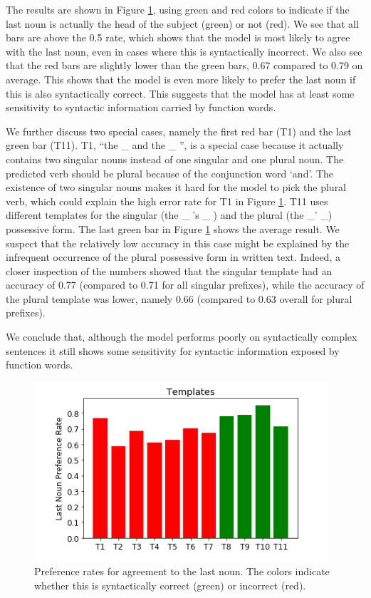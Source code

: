 The results are shown in Figure \ref{fig:last_noun_rates},
using green and red colors to indicate if 
the last noun is actually the head of the subject (green)
or not (red). 
%
We see that all bars are above the 0.5 rate,
which shows that the model is most
likely to agree with the last noun,
even in cases where this is syntactically incorrect. 
%
We also see that the red bars are slightly
lower than the green bars,
0.67 compared to 0.79 on average.
This shows that the model is even more likely
to prefer the last noun if this is
also syntactically correct.
This suggests that the model has 
at least some sensitivity
to syntactic information carried by function words.
%

%
We further discuss two special cases,
namely the first red bar (T1) and 
the last green bar (T11).
T1, ``the \_ and the \_ '', is a special case because it 
actually contains two singular nouns
instead of one singular and one plural noun. 
The predicted verb should be plural because of the
conjunction word `and'.
The existence of two singular nouns 
makes it hard for the model
to pick the plural verb,
which could explain the high error rate
for T1 in Figure \ref{fig:last_noun_rates}.
%
T11 uses different templates for the singular 
(the \_ 's \_ ) and the plural (the \_' \_) possessive form.
The last green bar in Figure \ref{fig:last_noun_rates} shows the average result.
We suspect that the relatively low accuracy
in this case might be explained by the infrequent
occurrence of the plural possessive form in written text.
Indeed, a closer inspection of the numbers showed that
the singular template had an accuracy
of 0.77 (compared to 0.71 for all singular prefixes), 
while the accuracy of the plural template
was lower, namely 0.66 (compared to 0.63 overall for plural prefixes).
%

We conclude that, although the model 
performs poorly on syntactically complex sentences it
still shows some sensitivity for syntactic 
information exposed by function words. 


\begin{figure}
    \centering
\includegraphics[scale=0.5]{screenshot-syntactic-templates} 
\caption{Preference rates for agreement to the last noun.
The colors indicate whether this is syntactically correct (green)
or incorrect (red).
}
\label{fig:last_noun_rates}
\end{figure}



